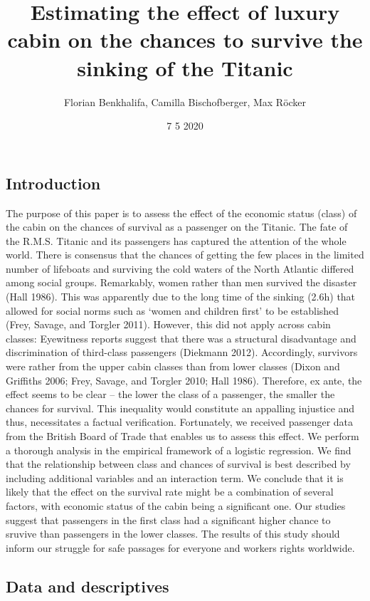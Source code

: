 \documentclass[
]{article}
\title{Estimating the effect of luxury cabin on the chances to survive the
sinking of the Titanic}
\author{Florian Benkhalifa, Camilla Bischofberger, Max Röcker}
\date{7 5 2020}
\begin{document}
\maketitle

\hypertarget{introduction}{%
\subsection{Introduction}\label{introduction}}

The purpose of this paper is to assess the effect of the economic status
(class) of the cabin on the chances of survival as a passenger on the
Titanic. The fate of the R.M.S. Titanic and its passengers has captured
the attention of the whole world. There is consensus that the chances of
getting the few places in the limited number of lifeboats and surviving
the cold waters of the North Atlantic differed among social groups.
Remarkably, women rather than men survived the disaster (Hall 1986).
This was apparently due to the long time of the sinking (2.6h) that
allowed for social norms such as `women and children first' to be
established (Frey, Savage, and Torgler 2011). However, this did not
apply across cabin classes: Eyewitness reports suggest that there was a
structural disadvantage and discrimination of third-class passengers
(Diekmann 2012). Accordingly, survivors were rather from the upper cabin
classes than from lower classes (Dixon and Griffiths 2006; Frey, Savage,
and Torgler 2010; Hall 1986). Therefore, ex ante, the effect seems to be
clear -- the lower the class of a passenger, the smaller the chances for
survival. This inequality would constitute an appalling injustice and
thus, necessitates a factual verification. Fortunately, we received
passenger data from the British Board of Trade that enables us to assess
this effect. We perform a thorough analysis in the empirical framework
of a logistic regression. We find that the relationship between class
and chances of survival is best described by including additional
variables and an interaction term. We conclude that it is likely that
the effect on the survival rate might be a combination of several
factors, with economic status of the cabin being a significant one. Our
studies suggest that passengers in the first class had a significant
higher chance to sruvive than passengers in the lower classes. The
results of this study should inform our struggle for safe passages for
everyone and workers rights worldwide.

\hypertarget{data-and-descriptives}{%
\subsection{Data and descriptives}\label{data-and-descriptives}}
\end{document}

